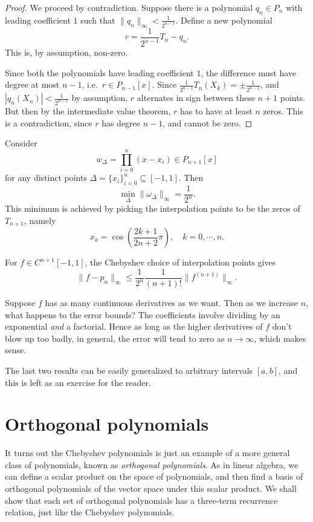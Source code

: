 \documentclass[a4paper]{article}
\begin{document}
\begin{proof}
  We proceed by contradiction. Suppose there is a polynomial $q_n \in P_n$ with leading coefficient $1$ such that $\|q_n\|_{\infty} < \frac{1}{2^{n - 1}}$. Define a new polynomial
  \[
    r = \frac{1}{2^{n - 1}}T_n - q_n.
  \]
  This is, by assumption, non-zero.

  Since both the polynomials have leading coefficient $1$, the difference must have degree at most $n - 1$, i.e.\ $r \in P_{n - 1}[x]$. Since $\frac{1}{2^{n - 1}}T_n(X_k) = \pm \frac{1}{2^{n - 1}}$, and $|q_n(X_n)| < \frac{1}{2^{n - 1}}$ by assumption, $r$ alternates in sign between these $n + 1$ points. But then by the intermediate value theorem, $r$ has to have at least $n$ zeros. This is a contradiction, since $r$ has degree $n - 1$, and cannot be zero.
\end{proof}

\begin{cor}
  Consider
  \[
    w_\Delta = \prod_{i = 0}^n (x - x_i) \in P_{n + 1}[x]
  \]
  for any distinct points $\Delta = \{x_i\}_{i = 0}^n \subseteq [-1, 1]$. Then
  \[
    \min_{\Delta} \|\omega_{\Delta}\|_{\infty} = \frac{1}{2^n}.
  \]
  This minimum is achieved by picking the interpolation points to be the zeros of $T_{n + 1}$, namely
  \[
    x_k = \cos\left(\frac{2k + 1}{2n + 2} \pi\right), \quad k = 0, \cdots, n.
  \]
\end{cor}

\begin{thm}
  For $f \in C^{n + 1}[-1, 1]$, the Chebyshev choice of interpolation points gives
  \[
    \|f - p_n\|_{\infty} \leq \frac{1}{2^n} \frac{1}{(n + 1)!} \|f^{(n + 1)}\|_{\infty}.
  \]
\end{thm}
Suppose $f$ has as many continuous derivatives as we want. Then as we increase $n$, what happens to the error bounds? The coefficients involve dividing by an exponential \emph{and} a factorial. Hence as long as the higher derivatives of $f$ don't blow up too badly, in general, the error will tend to zero as $n \to \infty$, which makes sense.

The last two results can be easily generalized to arbitrary intervals $[a, b]$, and this is left as an exercise for the reader.

\section{Orthogonal polynomials}
It turns out the Chebyshev polynomials is just an example of a more general class of polynomials, known as \emph{orthogonal polynomials}. As in linear algebra, we can define a scalar product on the space of polynomials, and then find a basis of orthogonal polynomials of the vector space under this scalar product. We shall show that each set of orthogonal polynomials has a three-term recurrence relation, just like the Chebyshev polynomials.
\end{document}
